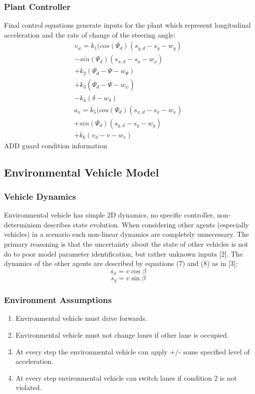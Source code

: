\subsubsection{Plant Controller}
Final control equations generate inputs for the plant which represent longitudinal acceleration and the rate of change of the steering angle:
	\begin{equation}
	\begin{aligned}
	v_w=k_1(cos{(\Psi_d)}(s_{y,d}-s_y-w_y)\\
	-sin{(\Psi_d)}(s_{x,d}-s_x-w_x)\\ 
	+k_2(\Psi_d-\Psi-w_{\Psi}) \\
	+k_3(\dot{\Psi_d} -\dot{\Psi}-w_{\psi})\\
	-k_4(\delta-w_{\delta})
	\end{aligned}
	\end{equation}
	\begin{equation}
	\begin{aligned}
	a_x=k_5(cos{(\Psi_d)}(s_{x,d}-s_x-w_x)\\
	+sin{(\Psi_d)}(s_{y,d}-s_y-w_y)\\
	+k_6(v_d-v-w_v)
	\end{aligned}
	\end{equation}
ADD guard condition information


\subsection{Environmental Vehicle Model}
\subsubsection{Vehicle Dynamics}
Environmental vehicle has simple 2D dynamics, no specific controller, non-determinism describes state evolution. When considering other agents (especially vehicles) in a scenario such non-linear dynamics are completely unnecessary. The primary reasoning is that the uncertainty about the state of other vehicles is not do to poor model parameter identification, but rather unknown inputs [2]. The dynamics of the other agents are described by equations (7) and (8) as in [3]:
\begin{equation}
\dot{s_x}=v\cos{\beta}
\end{equation}
\begin{equation}
\dot{s_y}=v\sin{\beta}
\end{equation}

\subsubsection{Environment Assumptions}
\begin{enumerate}
	\item Environmental vehicle must drive forwards.
	\item Environmental vehicle must not change lanes if other lane is occupied.
	\item At every step the environmental vehicle can apply +/- some specified level of acceleration.
	\item At every step environmental vehicle can switch lanes if condition 2 is not violated.
\end{enumerate}

